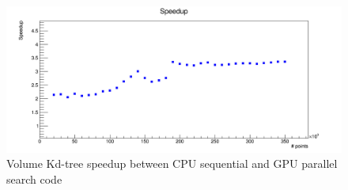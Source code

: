 \begin{figure}
\includegraphics[width=\textwidth]{volumeKdPlot/volumeKdSpeedup.png}
\caption{Volume Kd-tree speedup between CPU sequential and GPU parallel search code}
\label{volume_kdtree_speedup}
\end{figure}
\newpage

